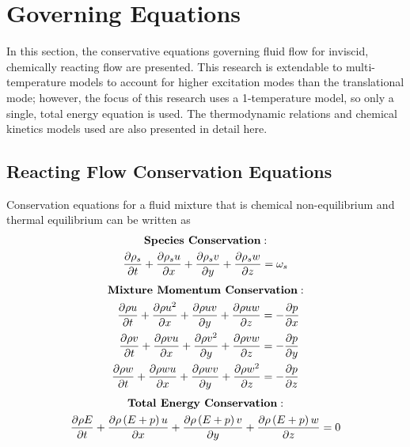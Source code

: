 \chapter{Governing Equations}
\label{chapter-two}

In this section, the conservative equations governing fluid flow for inviscid,
chemically reacting flow are presented.  This research is extendable to
multi-temperature models to account for higher excitation modes than the
translational mode; however, the focus of this research uses a 1-temperature
model, so only a single, total energy equation is used.  The thermodynamic
relations and chemical kinetics models used are also presented in detail here.

\section{Reacting Flow Conservation Equations}

Conservation equations for a fluid mixture that is chemical non-equilibrium and
thermal equilibrium can be written as
\begin{equation}
  \begin{gathered}
    \text{\bf{Species Conservation}}: \\
     \frac{\partial \rho_s}{\partial t} + \frac{\partial \rho_s u}{\partial x} + \frac{\partial \rho_s v}{\partial y} + \frac{\partial \rho_s w}{\partial z} =
     \omega_s
  \end{gathered}
  \label{species-cons}
\end{equation}
\begin{equation}
  \begin{gathered}
    \text{\bf{Mixture Momentum Conservation}}: \\
    \begin{aligned}
    \frac{\partial \rho u}{\partial t} + \frac{\partial \rho u^2}{\partial x} + \frac{\partial \rho u v}{\partial y} + \frac{\partial \rho u w}{\partial z} &= -\frac{\partial p}{\partial x}\\
    \frac{\partial \rho v}{\partial t} + \frac{\partial \rho v u}{\partial x} + \frac{\partial \rho v^2}{\partial y} + \frac{\partial \rho v w}{\partial z} &= -\frac{\partial p}{\partial y}\\
    \frac{\partial \rho w}{\partial t} + \frac{\partial \rho w u}{\partial x} + \frac{\partial \rho w v}{\partial y} + \frac{\partial \rho w^2}{\partial z} &= -\frac{\partial p}{\partial z}
    \end{aligned}
  \end{gathered}
  \label{mix-mom-cons}
\end{equation}
\begin{equation}
  \begin{gathered}
    \text{\bf{Total Energy Conservation}}: \\
     \frac{\partial \rho E}{\partial t} 
    + \frac{\partial \rho \left( E + p \right) u}{\partial x} 
    + \frac{\partial \rho \left( E + p \right) v}{\partial y}
    + \frac{\partial \rho \left( E + p \right) w}{\partial z} = 0
  \end{gathered}
  \label{tot-energy-cons}
\end{equation}

